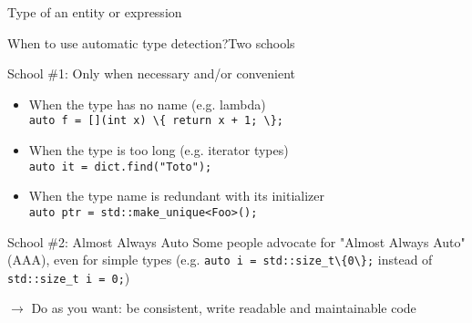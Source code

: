 \begin{frame}{Type of an entity or expression}{}
  \begin{example}
  \end{example}
\end{frame}


\begin{frame}{When to use automatic type detection?}{Two schools}
  \begin{block}{School \#1: Only when necessary and/or convenient}
    \begin{itemize}
    \item
      When the type has no name (e.g. lambda) \\
      \lstinline!auto f = [](int x) \{ return x + 1; \};!
    \item
      When the type is too long (e.g. iterator types) \\
      \lstinline!auto it = dict.find("Toto");!
    \item
      When the type name is redundant with its initializer \\
      \lstinline!auto ptr = std::make_unique<Foo>();!
    \end{itemize}
  \end{block}
  \begin{block}{School \#2: Almost Always Auto}
    Some people advocate for "Almost Always Auto" (AAA), even for simple types
    (e.g. \lstinline!auto i = std::size_t\{0\};! instead of \lstinline!std::size_t i = 0;!)
  \end{block}
  $\to$ Do as you want: be consistent, write readable and maintainable code
\end{frame}


%
%
%


